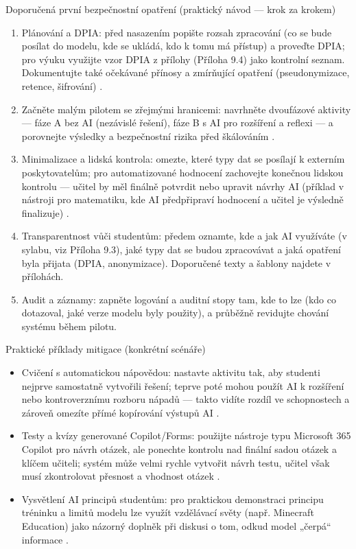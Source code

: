 Doporučená první bezpečnostní opatření (praktický návod — krok za krokem)
\begin{enumerate}
  \item Plánování a DPIA: před nasazením popište rozsah zpracování (co se bude posílat do modelu, kde se ukládá, kdo k tomu má přístup) a proveďte DPIA; pro výuku využijte vzor DPIA z přílohy (Příloha 9.4) jako kontrolní seznam. Dokumentujte také očekávané přínosy a zmírňující opatření (pseudonymizace, retence, šifrování) \cite{kb_malinka_chatgpt_ve_vyuce_dva_roky_pote_2024_pdf_90bc3aaf_page_12_1}.
  \item Začněte malým pilotem se zřejmými hranicemi: navrhněte dvoufázové aktivity — fáze A bez AI (nezávislé řešení), fáze B s AI pro rozšíření a reflexi — a porovnejte výsledky a bezpečnostní rizika před škálováním \cite{kb_malinka_chatgpt_ve_vyuce_dva_roky_pote_2024_pdf_90bc3aaf_page_12_1}.
  \item Minimalizace a lidská kontrola: omezte, které typy dat se posílají k externím poskytovatelům; pro automatizované hodnocení zachovejte konečnou lidskou kontrolu — učitel by měl finálně potvrdit nebo upravit návrhy AI (příklad v nástroji pro matematiku, kde AI předpřipraví hodnocení a učitel je výsledně finalizuje) \cite{kb_ai_101_tipu_pdf_04e4a115_page_8_1}.
  \item Transparentnost vůči studentům: předem oznamte, kde a jak AI využíváte (v sylabu, viz Příloha 9.3), jaké typy dat se budou zpracovávat a jaká opatření byla přijata (DPIA, anonymizace). Doporučené texty a šablony najdete v přílohách.
  \item Audit a záznamy: zapněte logování a auditní stopy tam, kde to lze (kdo co dotazoval, jaké verze modelu byly použity), a průběžně revidujte chování systému během pilotu.
\end{enumerate}

Praktické příklady mitigace (konkrétní scénáře)
\begin{itemize}
  \item Cvičení s automatickou nápovědou: nastavte aktivitu tak, aby studenti nejprve samostatně vytvořili řešení; teprve poté mohou použít AI k rozšíření nebo kontroverznímu rozboru nápadů — takto vidíte rozdíl ve schopnostech a zároveň omezíte přímé kopírování výstupů AI \cite{kb_malinka_chatgpt_ve_vyuce_dva_roky_pote_2024_pdf_90bc3aaf_page_12_1}.
  \item Testy a kvízy generované Copilot/Forms: použijte nástroje typu Microsoft 365 Copilot pro návrh otázek, ale ponechte kontrolu nad finální sadou otázek a klíčem učiteli; systém může velmi rychle vytvořit návrh testu, učitel však musí zkontrolovat přesnost a vhodnost otázek \cite{kb_ai_101_tipu_pdf_04e4a115_page_36_1}.
  \item Vysvětlení AI principů studentům: pro praktickou demonstraci principu tréninku a limitů modelu lze využít vzdělávací světy (např. Minecraft Education) jako názorný doplněk při diskusi o tom, odkud model „čerpá“ informace \cite{kb_ai_101_tipu_pdf_04e4a115_page_15_2}.
\end{itemize}

